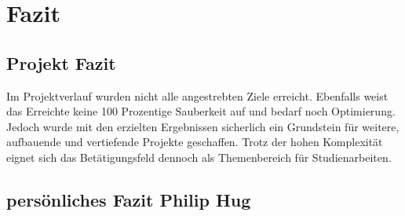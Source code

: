 \chapter{Fazit}

\section{Projekt Fazit}
Im Projektverlauf wurden nicht alle angestrebten Ziele erreicht. Ebenfalls weist das Erreichte keine 100 Prozentige Sauberkeit auf und bedarf noch Optimierung. Jedoch wurde mit den erzielten Ergebnissen sicherlich ein Grundstein für weitere, aufbauende und vertiefende Projekte geschaffen. Trotz der hohen Komplexität eignet sich das Betätigungsfeld dennoch als Themenbereich für Studienarbeiten.

\section{persönliches Fazit Philip Hug}

